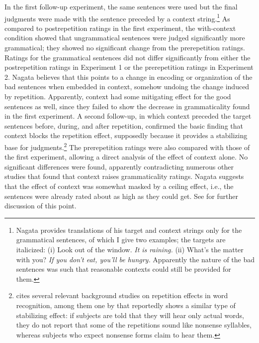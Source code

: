 In the first follow-up experiment, the same sentences were used but the final judgments were made with the sentence preceded by a context string.\footnote{Nagata provides translations of his target and context strings only for the grammatical sentences, of which I give two examples; the targets are italicized: (i) Look out of the window. \textit{It is raining.} (ii) What's the matter with you? \textit{If you don't eat, you'll be hungry.} Apparently the nature of the bad sentences was such that reasonable contexts could still be provided for them.}
 As compared to postrepetition ratings in the first experiment, the with-context condition showed that ungrammatical sentences were judged significantly more grammatical; they showed no significant change from the prerepetition ratings. Ratings for the grammatical sentences did not differ significantly from either the postrepetition ratings in Experiment 1 or the prerepetition ratings in Experiment 2. Nagata believes that this points to a change in encoding or organization of the bad sentences when embedded in context, somehow undoing the change induced by repetition. Apparently, context had some mitigating effect for the good sentences as well, since they failed to show the decrease in grammaticality found in the first experiment. A second follow-up, in which context preceded the target sentences before, during, and after repetition, confirmed the basic finding that context blocks the repetition effect, supposedly because it provides a stabilizing base for judgments.\footnote{\citet{Spencer1973} cites several relevant background studies on repetition effects in word recognition, among them one by \citet{TaylorEtAl1963} that reportedly shows a similar type of stabilizing effect: if subjects are told that they will hear only actual words, they do not report that some of the repetitions sound like nonsense syllables, whereas subjects who expect nonsense forms claim to hear them.}
The prerepetition ratings were also compared with those of the first experiment, allowing a direct analysis of the effect of context alone. No significant
differences were found, apparently contradicting numerous other studies that found that context raises grammaticality ratings. Nagata suggests that the effect of context was somewhat masked by a ceiling effect, i.e., the sentences were already rated about as high as they could get. See  for further discussion of this point.

